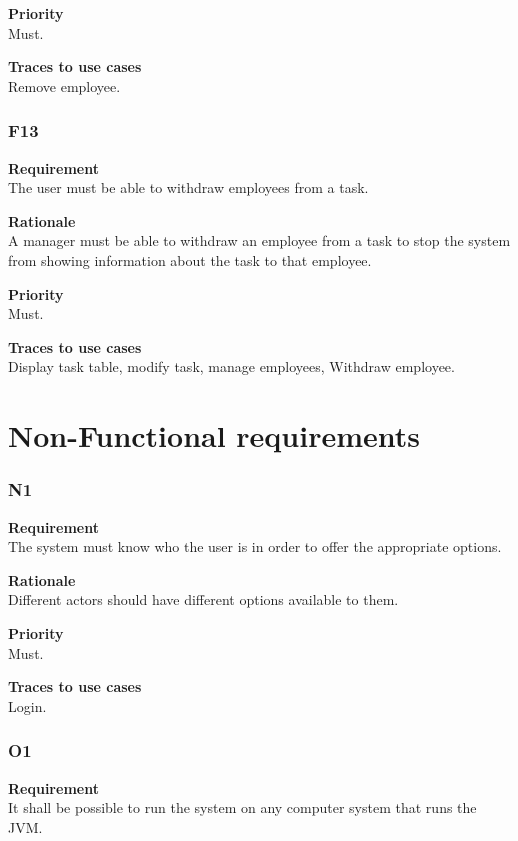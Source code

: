 \documentclass[12pt]{article}
\begin{document}
\noindent
{\bf Priority}\\
Must.

\noindent
{\bf Traces to use cases}\\
Remove employee.

\subsubsection{F13} \label{uc:13}

\noindent
{\bf Requirement}\\
The user must be able to withdraw employees from a task.

\noindent
{\bf Rationale}\\
A manager must be able to withdraw an employee from a task to stop the system from showing information about the task to that employee.

\noindent
{\bf Priority}\\
Must.

\noindent
{\bf Traces to use cases}\\
Display task table, modify task, manage employees, Withdraw employee.

\section{Non-Functional requirements}

\subsubsection{N1} \label{uc:N1}

\noindent
{\bf Requirement}\\
The system must know who the user is in order to offer the appropriate options.

\noindent
{\bf Rationale}\\
Different actors should have different options available to them.

\noindent
{\bf Priority}\\
Must.

\noindent
{\bf Traces to use cases}\\
Login.

\subsubsection{O1} \label{uc:O1}

\noindent
{\bf Requirement}\\
It shall be possible to run the system on any computer system that runs the JVM.
\end{document}
